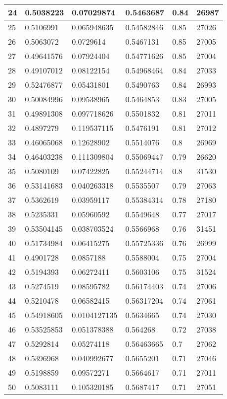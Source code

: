 \begin{longtable}{|l|l|l|l|l|l|}
24 & 0.5038223 & 0.07029874 & 0.5463687 & 0.84 & 26987 \\ \hline 
25 & 0.5106991 & 0.065948635 & 0.54582846 & 0.85 & 27026 \\ \hline 
26 & 0.5063072 & 0.0729614 & 0.5467131 & 0.85 & 27005 \\ \hline 
27 & 0.49641576 & 0.07924404 & 0.54771626 & 0.85 & 27004 \\ \hline 
28 & 0.49107012 & 0.08122154 & 0.54968464 & 0.84 & 27033 \\ \hline 
29 & 0.52476877 & 0.05431801 & 0.5490763 & 0.84 & 26993 \\ \hline 
30 & 0.50084996 & 0.09538965 & 0.5464853 & 0.83 & 27005 \\ \hline 
31 & 0.49891308 & 0.097718626 & 0.5501832 & 0.81 & 27011 \\ \hline 
32 & 0.4897279 & 0.119537115 & 0.5476191 & 0.81 & 27012 \\ \hline 
33 & 0.46065068 & 0.12628902 & 0.5514076 & 0.8 & 26969 \\ \hline 
34 & 0.46403238 & 0.111309804 & 0.55069447 & 0.79 & 26620 \\ \hline 
35 & 0.5080109 & 0.07422825 & 0.55244714 & 0.8 & 31530 \\ \hline 
36 & 0.53141683 & 0.040263318 & 0.5535507 & 0.79 & 27063 \\ \hline 
37 & 0.5362619 & 0.03959117 & 0.55384314 & 0.78 & 27180 \\ \hline 
38 & 0.5235331 & 0.05960592 & 0.5549648 & 0.77 & 27017 \\ \hline 
39 & 0.53504145 & 0.038703524 & 0.5566968 & 0.76 & 31451 \\ \hline 
40 & 0.51734984 & 0.06415275 & 0.55725336 & 0.76 & 26999 \\ \hline 
41 & 0.4901728 & 0.0857188 & 0.5588004 & 0.75 & 27004 \\ \hline 
42 & 0.5194393 & 0.06272411 & 0.5603106 & 0.75 & 31524 \\ \hline 
43 & 0.5274519 & 0.08595782 & 0.56174403 & 0.74 & 27006 \\ \hline 
44 & 0.5210478 & 0.06582415 & 0.56317204 & 0.74 & 27061 \\ \hline 
45 & 0.54918605 & 0.0104127135 & 0.5634665 & 0.74 & 27030 \\ \hline 
46 & 0.53525853 & 0.051378388 & 0.564268 & 0.72 & 27038 \\ \hline 
47 & 0.5292814 & 0.05274118 & 0.56463665 & 0.7 & 27062 \\ \hline 
48 & 0.5396968 & 0.040992677 & 0.5655201 & 0.71 & 27046 \\ \hline 
49 & 0.5198859 & 0.09572271 & 0.5664617 & 0.71 & 27011 \\ \hline 
50 & 0.5083111 & 0.105320185 & 0.5687417 & 0.71 & 27051 \\ \hline 
\end{longtable}